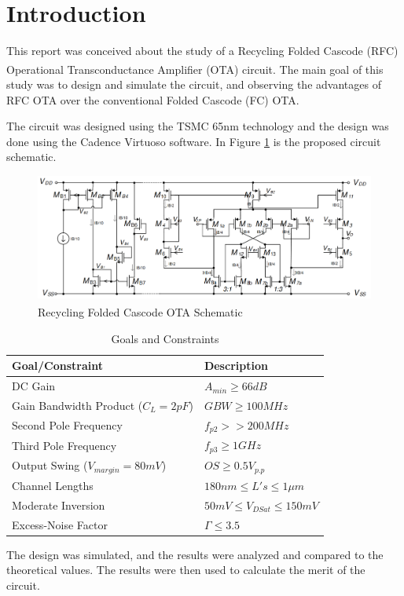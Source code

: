 \section{Introduction}

This report was conceived about the study of a Recycling Folded Cascode (RFC) Operational Transconductance Amplifier (OTA) circuit\textsuperscript{\cite{artigo-prof}}. The main goal of this study was to design and simulate the circuit, and observing the advantages of RFC OTA over the conventional Folded Cascode (FC) OTA. 

The circuit was designed using the TSMC 65nm technology and the design was done using the Cadence Virtuoso software. In Figure \ref{fig:OTA_schematic} is the proposed circuit schematic.

\begin{figure}[H]
    \centering
    \includegraphics[width=1\textwidth]{Images/RFC_OTA_schematic.png}
    \caption{Recycling Folded Cascode OTA Schematic\textsuperscript{\cite{Lab-statement}}}
    \label{fig:OTA_schematic}
\end{figure}

\begin{table}[h]
    \centering
    \caption{Goals and Constraints}
    \begin{tabularx}{\textwidth}{>{\centering\arraybackslash}X >{\centering\arraybackslash}X}
        \toprule
        \textbf{Goal/Constraint} & \textbf{Description}\\
        \midrule
        DC Gain & $A_{min}\geq 66dB$\\
        \midrule
        Gain Bandwidth Product ($C_L = 2pF$) & $GBW\geq100MHz$ \\
        \midrule
        Second Pole Frequency & $f_{p2}>>200MHz$ \\
        \midrule
        Third Pole Frequency & $f_{p3} \geq 1GHz$ \\
        \midrule
        Output Swing ($V_{margin}=80mV$) & $OS\geq 0.5 V_{p.p}$ \\
        \midrule
        Channel Lengths & $180nm \leq L's \leq 1 \mu m$ \\
        \midrule
        Moderate Inversion & $50mV \leq V_{DSat} \leq 150mV$ \\
        \midrule
        Excess-Noise Factor & $\Gamma \leq 3.5 $\\
        \bottomrule
    \end{tabularx}
    \label{tab:goals}
\end{table}

The design was simulated, and the results were analyzed and compared to the theoretical values. The results were then used to calculate the merit of the circuit.

\pagebreak

